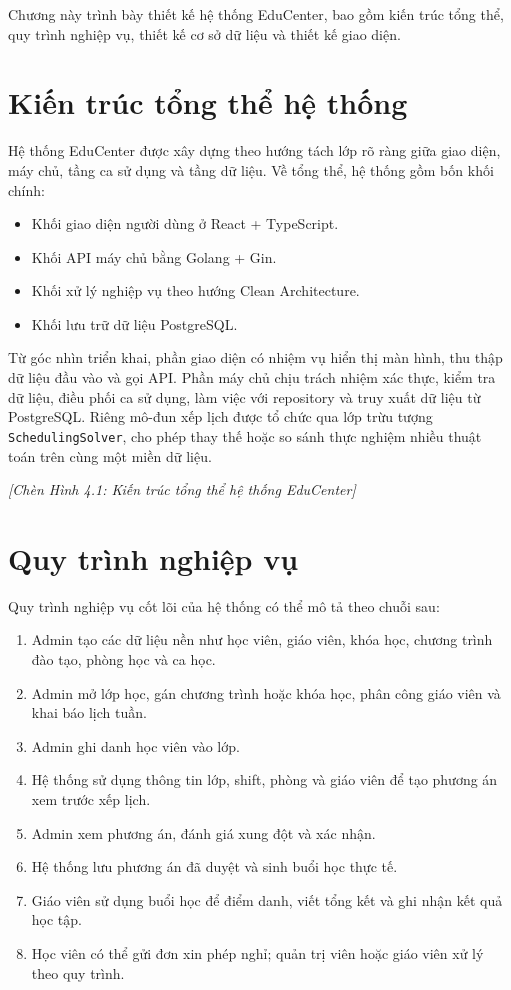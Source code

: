 \documentclass[../DoAn.tex]{subfiles}
\begin{document}
Chương này trình bày thiết kế hệ thống EduCenter, bao gồm kiến trúc tổng thể, quy trình nghiệp vụ, thiết kế cơ sở dữ liệu và thiết kế giao diện.

\section{Kiến trúc tổng thể hệ thống}
\label{section:4.1}

Hệ thống EduCenter được xây dựng theo hướng tách lớp rõ ràng giữa giao diện, máy chủ, tầng ca sử dụng và tầng dữ liệu. Về tổng thể, hệ thống gồm bốn khối chính:
\begin{itemize}
    \item Khối giao diện người dùng ở React + TypeScript.
    \item Khối API máy chủ bằng Golang + Gin.
    \item Khối xử lý nghiệp vụ theo hướng Clean Architecture.
    \item Khối lưu trữ dữ liệu PostgreSQL.
\end{itemize}

Từ góc nhìn triển khai, phần giao diện có nhiệm vụ hiển thị màn hình, thu thập dữ liệu đầu vào và gọi API. Phần máy chủ chịu trách nhiệm xác thực, kiểm tra dữ liệu, điều phối ca sử dụng, làm việc với repository và truy xuất dữ liệu từ PostgreSQL. Riêng mô-đun xếp lịch được tổ chức qua lớp trừu tượng \texttt{SchedulingSolver}, cho phép thay thế hoặc so sánh thực nghiệm nhiều thuật toán trên cùng một miền dữ liệu.

\textit{[Chèn Hình 4.1: Kiến trúc tổng thể hệ thống EduCenter]}

\section{Quy trình nghiệp vụ}
\label{section:4.2}

Quy trình nghiệp vụ cốt lõi của hệ thống có thể mô tả theo chuỗi sau:
\begin{enumerate}
    \item Admin tạo các dữ liệu nền như học viên, giáo viên, khóa học, chương trình đào tạo, phòng học và ca học.
    \item Admin mở lớp học, gán chương trình hoặc khóa học, phân công giáo viên và khai báo lịch tuần.
    \item Admin ghi danh học viên vào lớp.
    \item Hệ thống sử dụng thông tin lớp, shift, phòng và giáo viên để tạo phương án xem trước xếp lịch.
    \item Admin xem phương án, đánh giá xung đột và xác nhận.
    \item Hệ thống lưu phương án đã duyệt và sinh buổi học thực tế.
    \item Giáo viên sử dụng buổi học để điểm danh, viết tổng kết và ghi nhận kết quả học tập.
    \item Học viên có thể gửi đơn xin phép nghỉ; quản trị viên hoặc giáo viên xử lý theo quy trình.
\end{enumerate}
\end{document}
